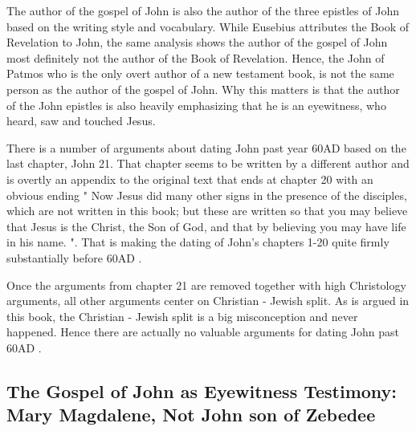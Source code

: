 The author of the gospel of John is also the author of the three epistles of John based on the writing style and vocabulary.
While Eusebius attributes the Book of Revelation to John, the same analysis shows the author of the gospel of John most definitely not the author of the Book of Revelation.
Hence, the John of Patmos who is the only overt author of a new testament book, is not the same person as the author of the gospel of John.
Why this matters is that the author of the John epistles is also heavily emphasizing that he is an eyewitness, who heard, saw and touched Jesus.

There is a number of arguments about dating John past year 60AD based on the last chapter, John 21.
That chapter seems to be written by a different author and is overtly an appendix to the original text that ends at chapter 20 with an obvious ending "
Now Jesus did many other signs in the presence of the disciples, which are not written in this book;
but these are written so that you may believe that Jesus is the Christ, the Son of God, and that by believing you may have life in his name.
".
That is making the dating of John's chapters 1-20 quite firmly substantially before 60AD .

Once the arguments from chapter 21 are removed together with high Christology arguments, all other arguments center on Christian - Jewish split.
As is argued in this book, the Christian - Jewish split is a big misconception and never happened.
Hence there are actually no valuable arguments for dating John past 60AD .

\subsection{The Gospel of John as Eyewitness Testimony: Mary Magdalene, Not John son of Zebedee}\label{subsec:the-gospel-of-john-is-widely-accepted-to-be-one-gospel-that-indicates-it-was-written-by-an-eyewitness.}

